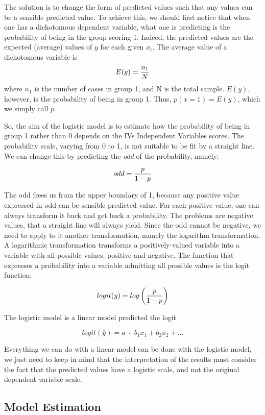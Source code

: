 \documentclass[
]{book}
\begin{document}
The solution is to change the form of predicted values such that any values can be a sensible predicted value. To achieve this, we should first notice that when one has a dichotomous dependent variable, what one is predicting is the probability of being in the group scoring 1. Indeed, the predicted values are the expected (average) values of \(y\) for each given \(x_i\). The average value of a dichotomous variable is
\[
E(y)={n_1 \over N}
\]
where \(n_1\) is the number of cases in group 1, and N is the total sample. \(E(y)\), however, is the probability of being in group 1. Thus, \(p(x=1)=E(y)\), which we simply call \(p\).

So, the aim of the logistic model is to estimate how the probability of being in group 1 rather than 0 depends on the {IVs {Independent Variables} } scores. The probability scale, varying from 0 to 1, is not suitable to be fit by a straight line. We can change this by predicting the \emph{odd} of the probability, namely:

\[
odd={p \over {1-p}}
\]

The odd frees us from the upper boundary of 1, because any positive value expressed in odd can be sensible predicted value. For each positive value, one can always transform it back and get back a probability. The problems are negative values, that a straight line will always yield. Since the odd cannot be negative, we need to apply to it another transformation, namely the logarithm transformation. A logarithmic transformation transforms a positively-valued variable into a variable with all possible values, positive and negative. The function that expresses a probability into a variable admitting all possible values is the logit function:

\[
logit(y)={log \left( {p \over 1-p} \right)}
\]

The logistic model is a linear model predicted the logit

\[
logit(\hat{y})=a+b_1  x_1+b_2 x_2+ ...
\]

Everything we can do with a linear model can be done with the logistic model, we just need to keep in mind that the interpretation of the results must consider the fact that the predicted values have a logistic scale, and not the original dependent variable scale.

\hypertarget{logisticestim}{%
\subsection{Model Estimation}\label{logisticestim}}
\end{document}
